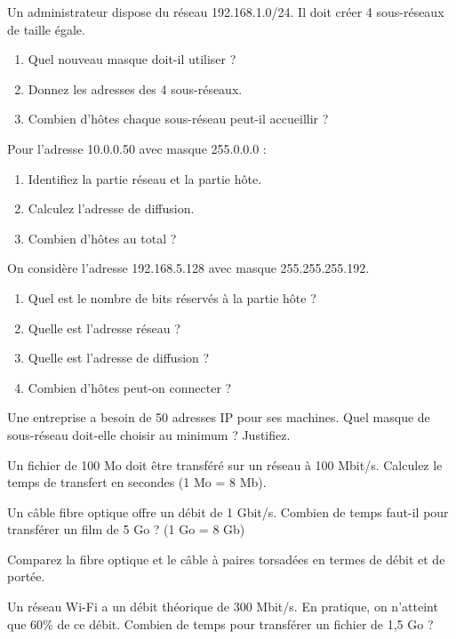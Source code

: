 \exo{}
Un administrateur dispose du réseau 192.168.1.0/24. Il doit créer 4 sous-réseaux de taille égale.
\begin{enumerate}
    \item Quel nouveau masque doit-il utiliser ?
    \item Donnez les adresses des 4 sous-réseaux.
    \item Combien d'hôtes chaque sous-réseau peut-il accueillir ?
\end{enumerate}

\exo{}
Pour l'adresse 10.0.0.50 avec masque 255.0.0.0 :
\begin{enumerate}
    \item Identifiez la partie réseau et la partie hôte.
    \item Calculez l'adresse de diffusion.
    \item Combien d'hôtes au total ?
\end{enumerate}

\exo{}
On considère l'adresse 192.168.5.128 avec masque 255.255.255.192.
\begin{enumerate}
    \item Quel est le nombre de bits réservés à la partie hôte ?
    \item Quelle est l'adresse réseau ?
    \item Quelle est l'adresse de diffusion ?
    \item Combien d'hôtes peut-on connecter ?
\end{enumerate}

\exo{}
Une entreprise a besoin de 50 adresses IP pour ses machines. Quel masque de sous-réseau doit-elle choisir au minimum ? Justifiez.


\exo{}
Un fichier de 100 Mo doit être transféré sur un réseau à 100 Mbit/s. Calculez le temps de transfert en secondes (1 Mo = 8 Mb).

\exo{}
Un câble fibre optique offre un débit de 1 Gbit/s. Combien de temps faut-il pour transférer un film de 5 Go ? (1 Go = 8 Gb)

\exo{}
Comparez la fibre optique et le câble à paires torsadées en termes de débit et de portée.

\exo{}
Un réseau Wi-Fi a un débit théorique de 300 Mbit/s. En pratique, on n'atteint que 60\% de ce débit. Combien de temps pour transférer un fichier de 1,5 Go ?

